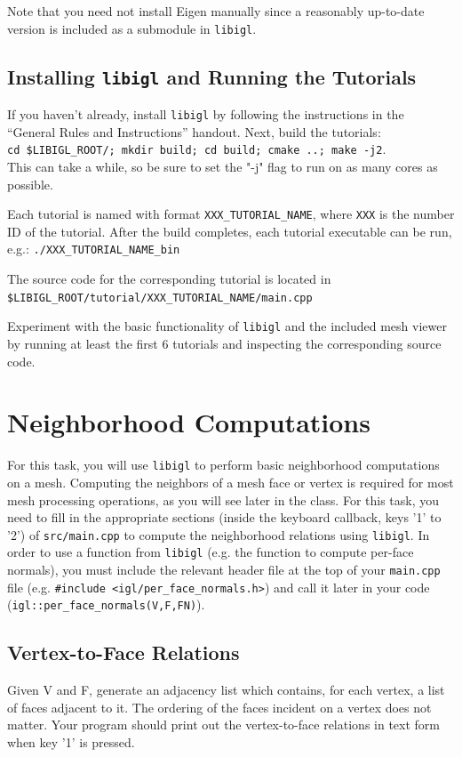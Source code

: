 \documentclass[11pt]{amsart}
\begin{document}
Note that you need not install Eigen manually since a reasonably up-to-date
version is included as a submodule in \texttt{libigl}.

\subsection{Installing \texttt{libigl} and Running the Tutorials}
If you haven't already, install \texttt{libigl} by following the
instructions in the ``General Rules and Instructions'' handout.
Next, build the tutorials: \\
\texttt{cd \$LIBIGL\_ROOT/; mkdir build; cd build; cmake ..; make -j2}.\\
This can take a while, so be sure to set the "-j" flag to run on as many cores
as possible.

\noindent Each tutorial is named with format \texttt{XXX\_TUTORIAL\_NAME},
where \texttt{XXX} is the number ID of the tutorial. After the build completes,
each tutorial executable can be run, e.g.: \texttt{./XXX\_TUTORIAL\_NAME\_bin} 

\noindent The source code for the corresponding tutorial is located in \\
 \texttt{\$LIBIGL\_ROOT/tutorial/XXX\_TUTORIAL\_NAME/main.cpp}

\noindent Experiment with the basic functionality of \texttt{libigl} and the
        included mesh viewer by running at least the first 6 tutorials and
        inspecting the corresponding source code. 

\section{Neighborhood Computations}
For this task, you will use \texttt{libigl} to perform basic neighborhood
computations on a mesh. Computing the neighbors of a mesh face or vertex is
required for most mesh processing operations, as you will see later in the
class. For this task, you need to fill in the appropriate sections (inside the
keyboard callback, keys '1' to '2') of \texttt{src/main.cpp} to compute the
neighborhood relations using \texttt{libigl}. In order to use a
function from \texttt{libigl} (e.g. the function to compute per-face normals),
you must include the relevant header file at the top of your \texttt{main.cpp}
file (e.g. \texttt{\#include <igl/per\_face\_normals.h>}) and call it later in
your code (\texttt{igl::per\_face\_normals(V,F,FN)}).

\subsection{Vertex-to-Face Relations}
Given V and F, generate an adjacency list which contains, for each vertex, a
list of faces adjacent to it. The ordering of the faces incident on a vertex
does not matter. Your program should print out the vertex-to-face relations in
text form when key '1' is pressed.
\end{document}

